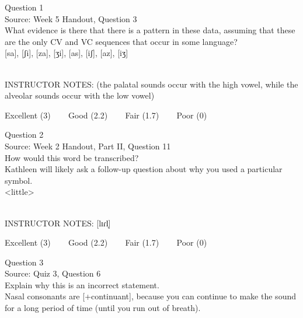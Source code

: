 \documentclass[12pt]{article}
\begin{document}
\begin{center}
\textbf{{\color{blue}{\HUGE START OF EXAM\\}}}

\textbf{{\color{blue}{\HUGE Student ID: 85868\\}}}

\textbf{{\color{blue}{\HUGE \\}}}

\end{center}
\newpage

{\large Question 1}\\

Source: Week 5 Handout, Question 3\\

What evidence is there that there is a pattern in these data, assuming that these are the only CV and VC sequences that occur in some language?\\

{[sa]}, {[ʃi]}, {[za]}, {[ʒi]}, {[as]}, {[iʃ]}, {[az]}, {[iʒ]}


~\\
INSTRUCTOR NOTES: (the palatal sounds occur with the high vowel, while the alveolar sounds occur with the low vowel)


\vfill
Excellent (3) ~~~ Good (2.2) ~~~ Fair (1.7) ~~~ Poor (0)
\newpage

{\large Question 2}\\

Source: Week 2 Handout, Part II, Question 11\\

How would this word be transcribed?\\ Kathleen will likely ask a follow-up question about why you used a particular symbol.\\

<little>


~\\
INSTRUCTOR NOTES: [lɪɾl̩]


\vfill
Excellent (3) ~~~ Good (2.2) ~~~ Fair (1.7) ~~~ Poor (0)
\newpage

{\large Question 3}\\

Source: Quiz 3, Question 6\\

Explain why this is an incorrect statement.\\

Nasal consonants are {[+continuant]}, because you can continue to make the sound for a long period of time (until you run out of breath).
\end{document}

